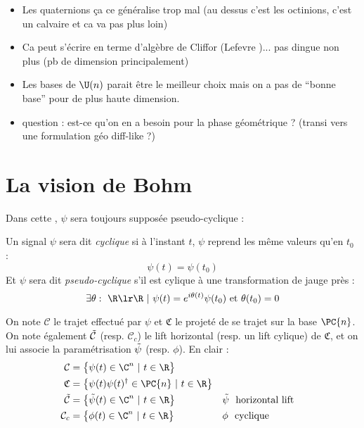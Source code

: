 \begin{itemize}
	\item Les quaternions ça ce généralise trop mal (au dessus c'est les octinions, c'est un calvaire et ca va pas plus loin)
	
	\item Ca peut s'écrire en terme d'algèbre de Cliffor (Lefevre \cite{lefevre_polarization_2021})... pas dingue non plus (pb de dimension principalement)
	
	\item Les bases de $\U(n)$ parait être le meilleur choix mais on a pas de ``bonne base'' pour de plus haute dimension.
	
	\item question : est-ce qu'on en a besoin pour la phase géométrique ? (transi vers une formulation géo diff-like ?)
\end{itemize}



\section{La vision de Bohm \cite[fig. 4.3]{bohm_geometric_2003}}
\label{sec:lift_approch}

Dans cette , $\psi$ sera toujours supposée pseudo-cyclique :
\begin{definition}
	Un signal $\psi$ sera dit \emph{cyclique} si à l'instant $t$, $\psi$ reprend les même valeurs qu'en $t_0$ :
	\[\psi(t)=\psi(t_0)\]
	Et $\psi$ sera dit \emph{pseudo-cyclique} s'il est cylique à une transformation de jauge près :
	\[\exists \theta:\ \R\lr\R\ |\ \psi(t) = e^{i\theta(t)}\psi(t_0)\text{ et } \theta(t_0)=0\]
\end{definition}

On note $\mathcal{C}$ le trajet effectué par $\psi$ et $\mathfrak{C}$ le projeté de se trajet sur la base $\PC{n}$. On note également $\Tilde{\mathcal{C}}$ (resp. $\mathcal{C}_c$) le lift horizontal (resp. un lift cylique) de $\mathfrak{C}$, et on lui associe la paramétrisation $\Tilde{\psi}$ (resp. $\phi$). En clair :
\begin{align*}
	\mathcal{C} &= \big\{ \psi(t)\in\C^n\ |\  t\in\R \big\} \\
	\mathfrak{C} &= \big\{ \psi(t) \psi(t)^\dagger \in\PC{n}\ |\  t\in\R \big\} \\
	\Tilde{\mathcal{C}} &= \big\{ \Tilde{\psi}(t)\in\C^n\ |\  t\in\R \big\}  &  &\Tilde{\psi}\ \text{ horizontal lift}\\
	\mathcal{C}_c &= \big\{ \phi(t)\in\C^n\ |\  t\in\R \big\}  &  &\phi\ \text{ cyclique}
\end{align*}
\\

